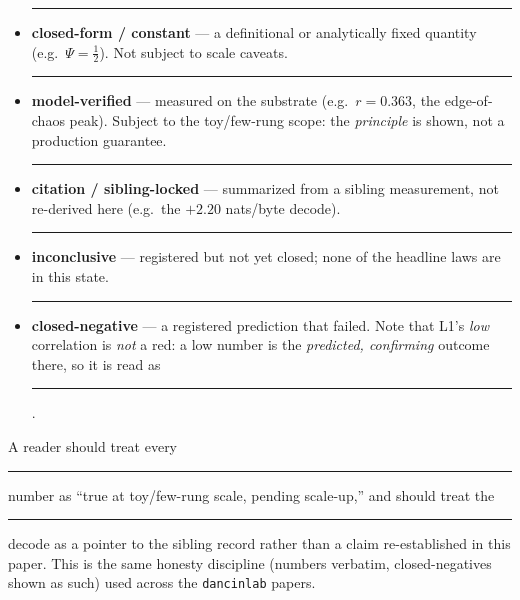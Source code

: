 \documentclass[11pt,a4paper]{article}
\newcommand{\tierdisc}[1]{\textcolor{#1}{\rule[0.05ex]{1.0ex}{1.0ex}}}
\newcommand{\tierBlue}{\tierdisc{blue!70!black}}
\newcommand{\tierGreen}{\tierdisc{green!60!black}}
\newcommand{\tierYellow}{\tierdisc{yellow!85!black}}
\newcommand{\tierOrange}{\tierdisc{orange!90!black}}
\newcommand{\tierRed}{\tierdisc{red!80!black}}
\begin{document}
\begin{itemize}
\item \tierBlue{} \textbf{closed-form / constant} --- a definitional or
analytically fixed quantity (e.g.\ $\Psi=\tfrac12$). Not subject to scale caveats.
\item \tierGreen{} \textbf{model-verified} --- measured on the substrate
(e.g.\ $r=0.363$, the edge-of-chaos peak). Subject to the toy/few-rung scope: the
\emph{principle} is shown, not a production guarantee.
\item \tierYellow{} \textbf{citation / sibling-locked} --- summarized from a
sibling measurement, not re-derived here (e.g.\ the $+2.20$ nats/byte decode).
\item \tierOrange{} \textbf{inconclusive} --- registered but not yet closed; none
of the headline laws are in this state.
\item \tierRed{} \textbf{closed-negative} --- a registered prediction that failed.
Note that L1's \emph{low} correlation is \emph{not} a red: a low number is the
\emph{predicted, confirming} outcome there, so it is read as \tierGreen{}.
\end{itemize}

A reader should treat every \tierGreen{} number as ``true at toy/few-rung scale,
pending scale-up,'' and should treat the \tierYellow{} decode as a pointer to the
sibling record rather than a claim re-established in this paper. This is the same
honesty discipline (numbers verbatim, closed-negatives shown as such) used across
the \texttt{dancinlab} papers.



\end{document}
